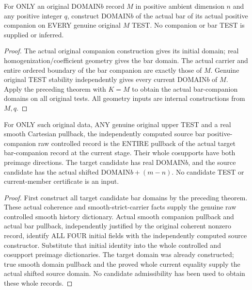 \begin{theorem}
\label{hir:original-arbitrary-bound-companion-bar-actual-domains}
\leanok
For ONLY an original DOMAIN$b$ record $M$ in positive ambient dimension $n$
and any positive integer $q$,
construct DOMAIN$b$ of the actual bar of its actual positive companion
on EVERY genuine original $M$ TEST. No companion or bar TEST is
supplied or inferred.
\end{theorem}
\begin{proof}
The actual original companion construction gives its initial domain;
real homogenization/coefficient geometry gives the bar domain. The
actual carrier and entire ordered boundary of the bar companion are
exactly those of $M$. Genuine original TEST stability independently
gives every current DOMAIN$b$ of $M$. Apply the preceding theorem with
$K=M$ to obtain the actual bar-companion domains on all original tests.
All geometry inputs are internal constructions from $M,q$.
\end{proof}

\begin{theorem}
\label{hir:original-arbitrary-bound-independent-companion-bar-smooth-current}
\leanok
For ONLY such original data, ANY genuine original upper TEST and a real
smooth Cartesian pullback, the independently computed source bar
positive-companion raw controlled record is the ENTIRE pullback of
the actual target bar-companion record at the current stage. Their
whole cosupports have both preimage directions. The target candidate
has real DOMAIN$b$, and the source candidate has the actual shifted
DOMAIN$b+(m-n)$. No candidate TEST or current-member certificate is
an input.
\end{theorem}
\begin{proof}
First construct all target candidate bar domains by the preceding
theorem. These actual coherence and smooth-strict-carrier facts supply
the genuine raw controlled smooth history dictionary. Actual smooth
companion pullback and actual bar pullback, independently justified by
the original coherent nonzero record, identify ALL FOUR initial
fields with the independently computed source constructor. Substitute
that initial identity into the whole controlled and cosupport
preimage dictionaries. The target domain was already constructed;
true smooth domain pullback and the proved whole current equality
supply the actual shifted source domain. No candidate admissibility
has been used to obtain these whole records.
\end{proof}

